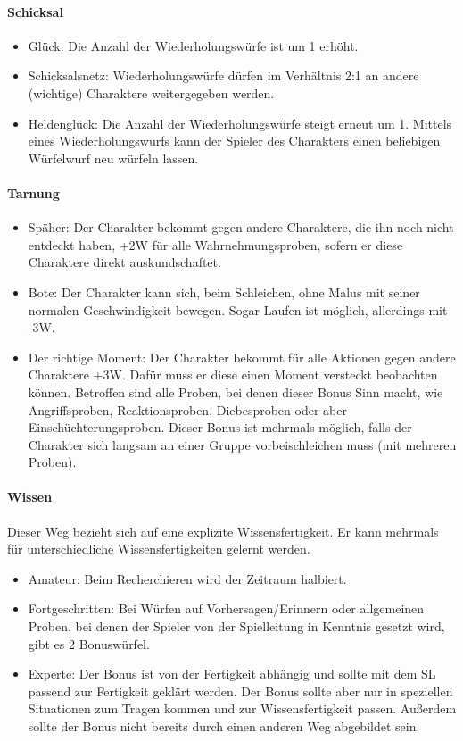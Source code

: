 \documentclass{article}
\begin{document}
\paragraph{Schicksal}

\begin{itemize}
\item Glück: Die Anzahl der Wiederholungswürfe ist um 1 erhöht.
\item Schicksalsnetz: Wiederholungswürfe dürfen im Verhältnis 2:1 an andere (wichtige) Charaktere weitergegeben werden.
\item Heldenglück: Die Anzahl der Wiederholungswürfe steigt erneut um 1. Mittels eines Wiederholungswurfs kann der Spieler des Charakters einen beliebigen Würfelwurf neu würfeln lassen.
\end{itemize}

\paragraph{Tarnung}

\begin{itemize}
\item Späher: Der Charakter bekommt gegen andere Charaktere, die ihn noch nicht entdeckt haben, +2W für alle Wahrnehmungsproben, sofern er diese Charaktere direkt auskundschaftet.
\item Bote: Der Charakter kann sich, beim Schleichen, ohne Malus mit seiner normalen Geschwindigkeit bewegen. Sogar Laufen ist möglich, allerdings mit -3W.
\item Der richtige Moment: Der Charakter bekommt für alle Aktionen gegen andere Charaktere +3W. Dafür muss er diese einen Moment versteckt beobachten können. Betroffen sind alle Proben, bei denen dieser Bonus Sinn macht, wie Angriffsproben, Reaktionsproben, Diebesproben oder aber Einschüchterungsproben. Dieser Bonus ist mehrmals möglich, falls der Charakter sich langsam an einer Gruppe vorbeischleichen muss (mit mehreren Proben).
\end{itemize}

\paragraph{Wissen}

Dieser Weg bezieht sich auf eine explizite Wissensfertigkeit. Er kann mehrmals für unterschiedliche
Wissensfertigkeiten gelernt werden.

\begin{itemize}
\item Amateur: Beim Recherchieren wird der Zeitraum halbiert.
\item Fortgeschritten: Bei Würfen auf Vorhersagen/Erinnern oder allgemeinen Proben, bei denen der Spieler von der Spielleitung in Kenntnis gesetzt wird, gibt es 2 Bonuswürfel.
\item Experte: Der Bonus ist von der Fertigkeit abhängig und sollte mit dem SL passend zur Fertigkeit geklärt werden. Der Bonus sollte aber nur in speziellen Situationen zum Tragen kommen und zur Wissensfertigkeit passen. Außerdem sollte der Bonus nicht bereits durch einen anderen Weg abgebildet sein.
\end{itemize}
\end{document}
